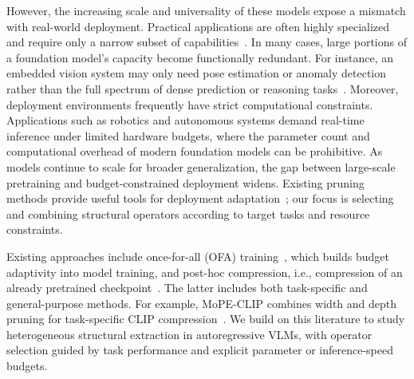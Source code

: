 \documentclass[11pt]{article}
\begin{document}
However, the increasing scale and universality of these models expose a mismatch with real-world deployment. Practical applications are often highly specialized and require only a narrow subset of capabilities~\cite{tan2022towards,wang2023efficientvlm,wang2025prada}. In many cases, large portions of a foundation model’s capacity become functionally redundant. For instance, an embedded vision system may only need pose estimation or anomaly detection rather than the full spectrum of dense prediction or reasoning tasks~\cite{zhuang2025argus}. Moreover, deployment environments frequently have strict computational constraints. Applications such as robotics and autonomous systems demand real-time inference under limited hardware budgets, where the parameter count and computational overhead of modern foundation models can be prohibitive. As models continue to scale for broader generalization, the gap between large-scale pretraining and budget-constrained deployment widens. Existing pruning methods provide useful tools for deployment adaptation~\cite{ma2023llm,he2024matters,zhao2025hape}; our focus is selecting and combining structural operators according to target tasks and resource constraints.

Existing approaches include once-for-all (OFA) training~\cite{cai2019once,cai2024flextron}, which builds budget adaptivity into model training, and post-hoc compression, i.e., compression of an already pretrained checkpoint~\cite{he2024rethinking,he2025understanding}. The latter includes both task-specific and general-purpose methods. For example, MoPE-CLIP combines width and depth pruning for task-specific CLIP compression~\cite{lin2024mope}. We build on this literature to study heterogeneous structural extraction in autoregressive VLMs, with operator selection guided by task performance and explicit parameter or inference-speed budgets.
\end{document}
